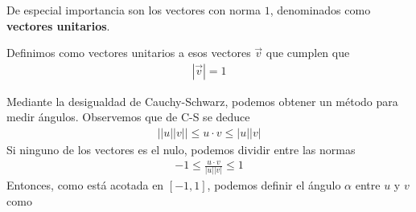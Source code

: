 \documentclass{../Calculo.tex}
\begin{document}
De especial importancia son los vectores con norma $1$, denominados como
\textbf{vectores unitarios}.
\begin{defin}
	Definimos como vectores unitarios a esos vectores $\vec{v}$ que cumplen que
	\begin{equation}
		\begin{split}
			|\vec{v}| = 1
		\end{split}
	\end{equation}
\end{defin}
Mediante la desigualdad de Cauchy-Schwarz, podemos obtener un método para medir
ángulos. Observemos que de C-S se deduce 
\begin{equation}
	\begin{split}
		||u||v|| \leq u\cdot v \leq |u||v|
	\end{split}
\end{equation}
Si ninguno de los vectores es el nulo, podemos dividir entre las normas
\begin{equation}
	\begin{split}
		-1\leq\frac{u\cdot v}{|u||v|} \leq 1
	\end{split}
\end{equation}
Entonces, como está acotada en $[-1,1]$, podemos definir el ángulo $\alpha$ entre
$u$ y $v$ como
\end{document}
